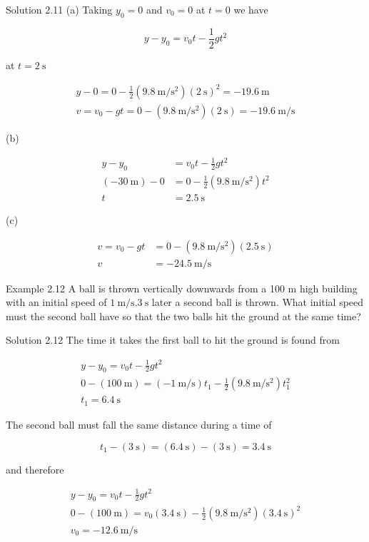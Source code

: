 \documentclass[10pt]{article}
\begin{document}
Solution 2.11 (a) Taking $y_{0}=0$ and $v_{0}=0$ at $t=0$ we have

$$
y-y_{0}=v_{0} t-\frac{1}{2} g t^{2}
$$

at $t=2 \mathrm{~s}$

$$
\begin{gathered}
y-0=0-\frac{1}{2}\left(9.8 \mathrm{~m} / \mathrm{s}^{2}\right)(2 \mathrm{~s})^{2}=-19.6 \mathrm{~m} \\
v=v_{0}-g t=0-\left(9.8 \mathrm{~m} / \mathrm{s}^{2}\right)(2 \mathrm{~s})=-19.6 \mathrm{~m} / \mathrm{s}
\end{gathered}
$$

(b)

$$
\begin{aligned}
y-y_{0} & =v_{0} t-\frac{1}{2} g t^{2} \\
(-30 \mathrm{~m})-0 & =0-\frac{1}{2}\left(9.8 \mathrm{~m} / \mathrm{s}^{2}\right) t^{2} \\
t & =2.5 \mathrm{~s}
\end{aligned}
$$

(c)

$$
\begin{aligned}
v=v_{0}-g t & =0-\left(9.8 \mathrm{~m} / \mathrm{s}^{2}\right)(2.5 \mathrm{~s}) \\
v & =-24.5 \mathrm{~m} / \mathrm{s}
\end{aligned}
$$

Example 2.12 A ball is thrown vertically downwards from a 100 m high building with an initial speed of $1 \mathrm{~m} / \mathrm{s} .3 \mathrm{~s}$ later a second ball is thrown. What initial speed must the second ball have so that the two balls hit the ground at the same time?

Solution 2.12 The time it takes the first ball to hit the ground is found from

$$
\begin{gathered}
y-y_{0}=v_{0} t-\frac{1}{2} g t^{2} \\
0-(100 \mathrm{~m})=(-1 \mathrm{~m} / \mathrm{s}) t_{1}-\frac{1}{2}\left(9.8 \mathrm{~m} / \mathrm{s}^{2}\right) t_{1}^{2} \\
t_{1}=6.4 \mathrm{~s}
\end{gathered}
$$

The second ball must fall the same distance during a time of

$$
t_{1}-(3 \mathrm{~s})=(6.4 \mathrm{~s})-(3 \mathrm{~s})=3.4 \mathrm{~s}
$$

and therefore

$$
\begin{gathered}
y-y_{0}=v_{0} t-\frac{1}{2} g t^{2} \\
0-(100 \mathrm{~m})=v_{0}(3.4 \mathrm{~s})-\frac{1}{2}\left(9.8 \mathrm{~m} / \mathrm{s}^{2}\right)(3.4 \mathrm{~s})^{2} \\
v_{0}=-12.6 \mathrm{~m} / \mathrm{s}
\end{gathered}
$$
\end{document}
